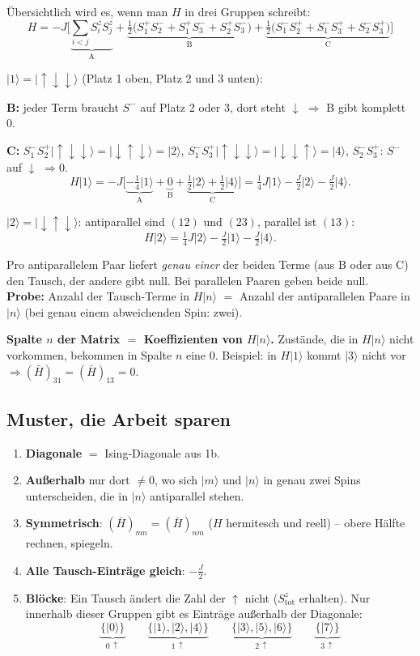 \documentclass[11pt,a4paper]{article}
\newcommand{\ket}[1]{\lvert #1\rangle}
\newcommand{\up}{{\uparrow}}
\newcommand{\dn}{{\downarrow}}
\newcommand{\Hbar}{\bar H}
\begin{document}
Übersichtlich wird es, wenn man $H$ in drei Gruppen schreibt:
\[
H = -J\Big[\underbrace{\textstyle\sum_{i<j}S^z_iS^z_j}_{\text{A}}
+ \underbrace{\tfrac12\big(S^+_1S^-_2 + S^+_1S^-_3 + S^+_2S^-_3\big)}_{\text{B}}
+ \underbrace{\tfrac12\big(S^-_1S^+_2 + S^-_1S^+_3 + S^-_2S^+_3\big)}_{\text{C}}\Big]
\]

\begin{rechnung}
$\ket1 = \ket{\up\dn\dn}$ (Platz 1 oben, Platz 2 und 3 unten):

\textbf{B:} jeder Term braucht $S^-$ auf Platz 2 oder 3, dort steht $\dn$ $\Rightarrow$ B gibt komplett $0$.

\textbf{C:} $S^-_1S^+_2\ket{\up\dn\dn} = \ket{\dn\up\dn} = \ket2$, \quad $S^-_1S^+_3\ket{\up\dn\dn} = \ket{\dn\dn\up} = \ket4$, \quad $S^-_2S^+_3$: $S^-$ auf $\dn$ $\Rightarrow 0$.
\[
H\ket1 = -J\Big[\underbrace{-\tfrac14\ket1}_{\text{A}} + \underbrace{0}_{\text{B}} + \underbrace{\tfrac12\ket2 + \tfrac12\ket4}_{\text{C}}\Big]
= \tfrac14J\ket1 - \tfrac J2\ket2 - \tfrac J2\ket4 .
\]

$\ket2 = \ket{\dn\up\dn}$: antiparallel sind $(12)$ und $(23)$, parallel ist $(13)$:
\[
H\ket2 = \tfrac14J\ket2 - \tfrac J2\ket1 - \tfrac J2\ket4 .
\]
\end{rechnung}

\begin{merk}
Pro antiparallelem Paar liefert \emph{genau einer} der beiden Terme (aus B oder aus C) den Tausch, der andere gibt null. Bei parallelen Paaren geben beide null. \\
\textbf{Probe:} Anzahl der Tausch-Terme in $H\ket n$ $=$ Anzahl der antiparallelen Paare in $\ket n$ (bei genau einem abweichenden Spin: zwei).
\end{merk}

\textbf{Spalte $n$ der Matrix $=$ Koeffizienten von $H\ket n$.} Zustände, die in $H\ket n$ nicht vorkommen, bekommen in Spalte $n$ eine 0. Beispiel: in $H\ket1$ kommt $\ket3$ nicht vor $\Rightarrow (\Hbar)_{31} = (\Hbar)_{13} = 0$.

\subsection{Muster, die Arbeit sparen}
\begin{enumerate}[itemsep=2pt]
\item \textbf{Diagonale} $=$ Ising-Diagonale aus 1b.
\item \textbf{Außerhalb} nur dort $\neq0$, wo sich $\ket m$ und $\ket n$ in genau zwei Spins unterscheiden, die in $\ket n$ antiparallel stehen.
\item \textbf{Symmetrisch}: $(\Hbar)_{mn} = (\Hbar)_{nm}$ ($H$ hermitesch und reell) -- obere Hälfte rechnen, spiegeln.
\item \textbf{Alle Tausch-Einträge gleich}: $-\tfrac J2$.
\item \textbf{Blöcke}: Ein Tausch ändert die Zahl der $\up$ nicht ($S^z_\text{tot}$ erhalten). Nur innerhalb dieser Gruppen gibt es Einträge außerhalb der Diagonale:
\[
\underbrace{\{\ket0\}}_{0\,\up}\qquad
\underbrace{\{\ket1,\ket2,\ket4\}}_{1\,\up}\qquad
\underbrace{\{\ket3,\ket5,\ket6\}}_{2\,\up}\qquad
\underbrace{\{\ket7\}}_{3\,\up}
\]
\end{enumerate}
\end{document}
